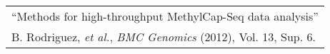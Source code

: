 \begin{tabularx}{\textwidth}{ X }
  ``Methods for high-throughput MethylCap-Seq data analysis'' \\
  \small{B. Rodriguez, \textit{et al.}, \textit{BMC Genomics} (2012), Vol. 13, Sup. 6.} \\
\end{tabularx}
